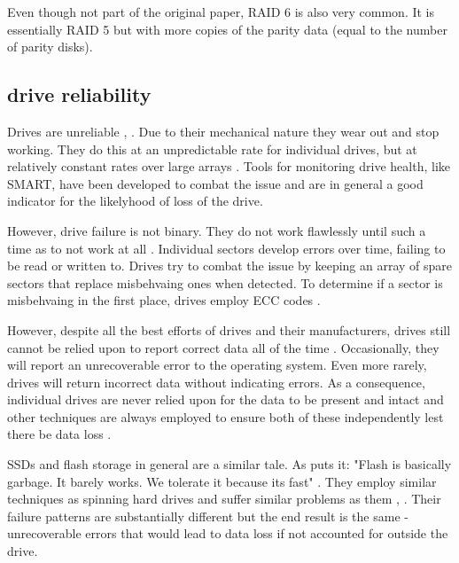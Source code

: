             Even though not part of the original paper, RAID 6 is also very
            common. It is essentially RAID 5 but with more copies of the parity
            data (equal to the number of parity disks).


        \subsection{drive reliability}
            \label{sec_reliability}

            Drives are unreliable \cite{RAID}, \cite{Backblaze_stats}. Due to
            their mechanical nature they wear out and stop working. They do
            this at an unpredictable rate for individual drives, but at
            relatively constant rates over large arrays \cite{Backblaze_stats}.
            Tools for monitoring drive health, like SMART, have been developed
            to combat the issue and are in general a good indicator for the
            likelyhood of loss of the drive.

            However, drive failure is not binary. They do not work flawlessly
            until such a time as to not work at all \cite{2D_RAID}. Individual
            sectors develop errors over time, failing to be read or written to.
            Drives try to combat the issue by keeping an array of spare sectors
            that replace misbehvaing ones when detected. To determine if a
            sector is misbehvaing in the first place, drives employ ECC codes
            \cite{data_corruption_storage_stack}.

            However, despite all the best efforts of drives and their
            manufacturers, drives still cannot be relied upon to report correct
            data all of the time \cite{data_corruption_storage_stack}.
            Occasionally, they will report an unrecoverable error to the
            operating system. Even more rarely, drives will return incorrect
            data without indicating errors. As a consequence, individual drives
            are never relied upon for the data to be present and intact and
            other techniques are always employed to ensure both of these
            independently lest there be data loss \cite{LTT_data_loss}.

            SSDs and flash storage in general are a similar tale. As
            \citeauthor{2D_RAID} puts it: "Flash is basically garbage. It
            barely works. We tolerate it because its fast" \cite{2D_RAID}. They
            employ similar techniques as spinning hard drives and suffer
            similar problems as them \cite{flash_large_scale},
            \cite{flash_reliability}. Their failure patterns are substantially
            different but the end result is the same - unrecoverable errors
            that would lead to data loss if not accounted for outside the
            drive.

